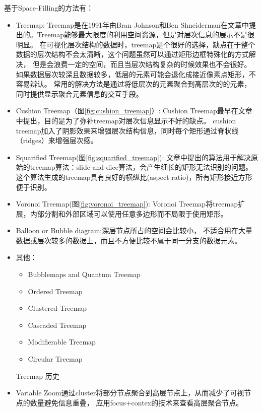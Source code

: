 \documentclass{article}
\begin{document}
基于Space-Filling的方法有：
\begin{itemize}
	\item Treemap:
		Treemap是在1991年由Bran Johnson和Ben Shneiderman在文章中提出的。Treemap能够最大限度的利用空间资源，但是对层次信息的展示不是很明显。
		在可视化层次结构的数据时，treemap是个很好的选择，缺点在于整个数据的层次结构不会太清晰，这个问题虽然可以通过矩形边框特殊化的方式解决，
		但是会浪费一定的空间，而且当层次结构复杂的时候效果也不会很好。如果数据层次较深且数据较多，低层的元素可能会退化成接近像素点矩形，不容易辨认。
		常用的解决方法是通过将低层次的元素聚合到高层次的的元素，同时提供显示聚合元素信息的交互手段。

	\item Cushion Treemap（图\ref{fig:cushion_treemap}）:
		Cushion Treemap最早在文章\cite{Wijk1999}中提出，目的是为了弥补treemap对层次信息显示不好的缺点。
		cushion treemap加入了阴影效果来增强层次结构信息，同时每个矩形通过脊状线（ridges）来增强层次感。

	\item Squarified Treemap(图\ref{fig:squarified_treemap}):
		文章\cite{Bruls99squarifiedtreemaps}中提出的算法用于解决原始的treemap算法：slide-and-dice算法，会产生细长的矩形无法识别的问题。
		这个算法生成的treemap具有良好的横纵比(aspect ratio)，所有矩形接近方形便于识别。

	\item Voronoi Treemap(图\ref{fig:voronoi_treemap}):
		Voronoi Treemap\cite{Balzer_voronoitreemaps}将treemap扩展，内部分割和外部区域可以使用任意多边形而不局限于使用矩形。

	\item Balloon\cite{boardman2000bubble} or Bubble diagram:深层节点所占的空间会比较小，
		不适合用在大量数据或层次较多的数据上，而且不方便比较不属于同一分支的数据元素。

	\item 其他：
		\begin{itemize}
			\item Bubblemaps and Quantum Treemap
			\item Ordered Treemap
			\item Clustered Treemap
			\item Cascaded Treemap
			\item Modifierable Treemap
			\item Circular Treemap
		\end{itemize}
		Treemap 历史\cite{treemaphistory}
	\item Variable Zoom\cite{schaffer1996navigating}通过cluster将部分节点聚合到高层节点上，从而减少了可视节点的数量避免信息重叠，
		应用focus+contex的技术来查看高层聚合节点。


\end{itemize}
\end{document}
